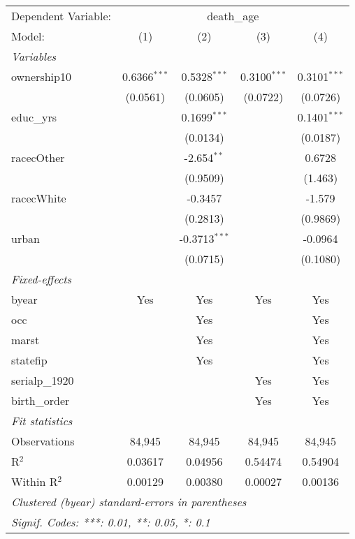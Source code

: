 
\begingroup
\centering
\begin{tabular}{lcccc}
   \tabularnewline \midrule \midrule
   Dependent Variable: & \multicolumn{4}{c}{death\_age}\\
   Model:         & (1)            & (2)             & (3)            & (4)\\  
   \midrule
   \emph{Variables}\\
   ownership10    & 0.6366$^{***}$ & 0.5328$^{***}$  & 0.3100$^{***}$ & 0.3101$^{***}$\\   
                  & (0.0561)       & (0.0605)        & (0.0722)       & (0.0726)\\   
   educ\_yrs      &                & 0.1699$^{***}$  &                & 0.1401$^{***}$\\   
                  &                & (0.0134)        &                & (0.0187)\\   
   racecOther     &                & -2.654$^{**}$   &                & 0.6728\\   
                  &                & (0.9509)        &                & (1.463)\\   
   racecWhite     &                & -0.3457         &                & -1.579\\   
                  &                & (0.2813)        &                & (0.9869)\\   
   urban          &                & -0.3713$^{***}$ &                & -0.0964\\   
                  &                & (0.0715)        &                & (0.1080)\\   
   \midrule
   \emph{Fixed-effects}\\
   byear          & Yes            & Yes             & Yes            & Yes\\  
   occ            &                & Yes             &                & Yes\\  
   marst          &                & Yes             &                & Yes\\  
   statefip       &                & Yes             &                & Yes\\  
   serialp\_1920  &                &                 & Yes            & Yes\\  
   birth\_order   &                &                 & Yes            & Yes\\  
   \midrule
   \emph{Fit statistics}\\
   Observations   & 84,945         & 84,945          & 84,945         & 84,945\\  
   R$^2$          & 0.03617        & 0.04956         & 0.54474        & 0.54904\\  
   Within R$^2$   & 0.00129        & 0.00380         & 0.00027        & 0.00136\\  
   \midrule \midrule
   \multicolumn{5}{l}{\emph{Clustered (byear) standard-errors in parentheses}}\\
   \multicolumn{5}{l}{\emph{Signif. Codes: ***: 0.01, **: 0.05, *: 0.1}}\\
\end{tabular}
\par\endgroup


